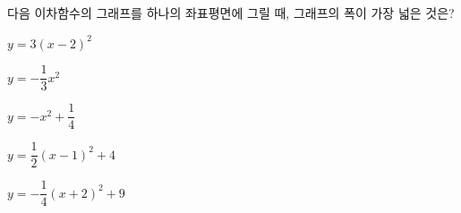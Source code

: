 다음 이차함수의 그래프를 하나의 좌표평면에 그릴 때, 그래프의 폭이 가장 넓은 것은?
\begin{choicesii}{\rule[-3ex]{0pt}{8ex}$y=3(x-2)^2$}{\rule[-3ex]{0pt}{8ex}$y=-\dfrac{1}{3}x^2$}{\rule[-3ex]{0pt}{8ex}$y=-x^2+\dfrac{1}{4}$}{\rule[-3ex]{0pt}{8ex}$y=\dfrac{1}{2}(x-1)^2+4$}{\rule[-3ex]{0pt}{8ex}$y=-\dfrac{1}{4}(x+2)^2+9$}\end{choicesii}

